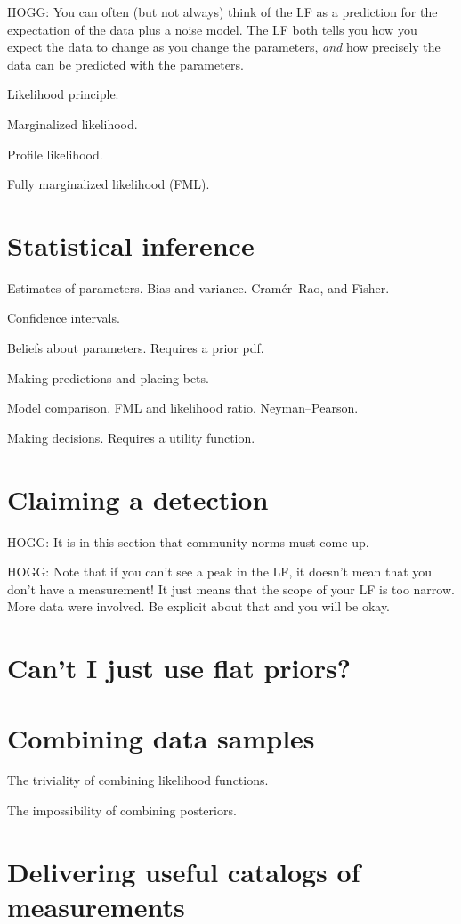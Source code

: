 \documentclass{article}
\begin{document}
HOGG: You can often (but not always) think of the LF as a prediction for the expectation of the data plus a noise model.
The LF both tells you how you expect the data to change as you change the parameters, \emph{and} how precisely the data can be predicted with the parameters.

Likelihood principle.

Marginalized likelihood.

Profile likelihood.

Fully marginalized likelihood (FML).

\section{Statistical inference}
Estimates of parameters. Bias and variance.
Cram\'er--Rao, and Fisher.

Confidence intervals.

Beliefs about parameters. Requires a prior pdf.

Making predictions and placing bets.

Model comparison. FML and likelihood ratio. Neyman--Pearson.

Making decisions. Requires a utility function.

\section{Claiming a detection}

HOGG: It is in this section that community norms must come up.

HOGG: Note that if you can't see a peak in the LF, it doesn't mean that you don't have a measurement! It just means that the scope of your LF is too narrow. More data were involved. Be explicit about that and you will be okay.

\section{Can't I just use flat priors?}

\section{Combining data samples}
The triviality of combining likelihood functions.

The impossibility of combining posteriors.

\section{Delivering useful catalogs of measurements}\label{sec:catalogs}
\end{document}
